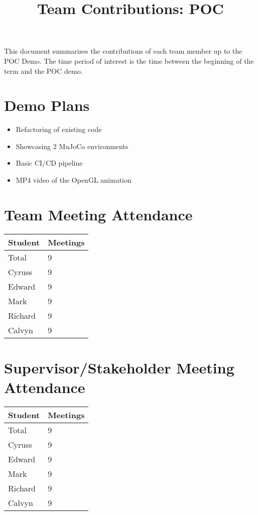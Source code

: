 \documentclass{article}
\title{Team Contributions: POC\\\progname}
\author{\authname}
\date{}
\begin{document}
\maketitle

This document summarizes the contributions of each team member up to the POC
Demo.  The time period of interest is the time between the beginning of the term
and the POC demo.

\section{Demo Plans}

\begin{itemize}
    \item Refactoring of existing code 
    \item Showcasing 2 MuJoCo environments
    \item Basic CI/CD pipeline
    \item MP4 video of the OpenGL animation
\end{itemize}

\section{Team Meeting Attendance}

\begin{table}[H]
\centering
\begin{tabular}{ll}
\toprule
\textbf{Student} & \textbf{Meetings}\\
\midrule
Total & 9\\
Cyruss & 9\\
Edward & 9\\
Mark & 9\\
Richard & 9\\
Calvyn & 9\\
\bottomrule
\end{tabular}
\end{table}

\section{Supervisor/Stakeholder Meeting Attendance}

\begin{table}[H]
    \centering
    \begin{tabular}{ll}
    \toprule
    \textbf{Student} & \textbf{Meetings}\\
    \midrule
    Total & 9\\
    Cyruss & 9\\
    Edward & 9\\
    Mark & 9\\
    Richard & 9\\
    Calvyn & 9\\
    \bottomrule
    \end{tabular}
    \end{table}
\end{document}
